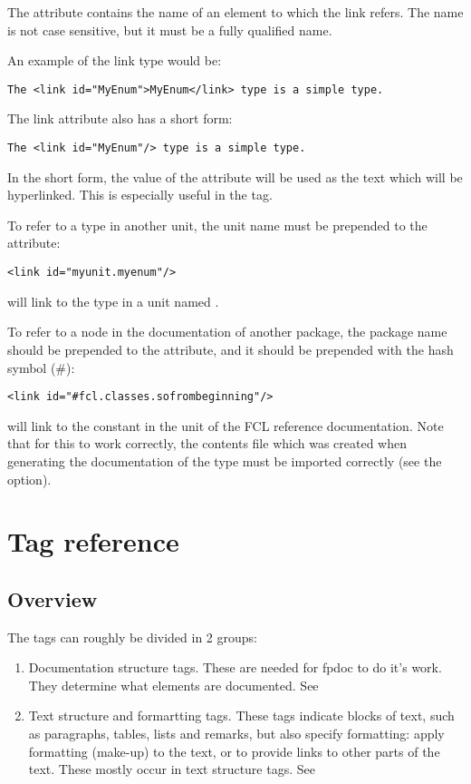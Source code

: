 The  attribute contains the name of an element to which the link
refers. The name is not case sensitive, but it must be a fully qualified
name.

An example of the link type would be:
\begin{verbatim}
The <link id="MyEnum">MyEnum</link> type is a simple type.
\end{verbatim}

The link attribute also has a short form: 
\begin{verbatim}
The <link id="MyEnum"/> type is a simple type.
\end{verbatim}
In the short form, the value of the  attribute will be used as the 
text which will be hyperlinked. This is especially useful in the 
tag.

To refer to a type in another unit, the unit name must be prepended to the
 attribute:
\begin{verbatim}
<link id="myunit.myenum"/>
\end{verbatim}
will link to the  type in a unit named .

To refer to a node in the documentation of another package, the package name
should be prepended to the  attribute, and it should be prepended
with the hash symbol (\#):
\begin{verbatim}
<link id="#fcl.classes.sofrombeginning"/>
\end{verbatim}
will link to the constant  in the  unit
of the FCL reference documentation. Note that for this to work correctly,
the contents file which was created when generating the documentation of 
the type must be imported correctly (see the  option).

\section{Tag reference}
\subsection{Overview}
The tags can roughly be divided in 2 groups:
\begin{enumerate}
\item Documentation structure tags. These are needed for fpdoc to do it's
work. They determine what elements are documented. See 
\item Text structure and formartting tags. These tags indicate blocks of text, such as
paragraphs, tables, lists and remarks, but also specify formatting: apply formatting (make-up) 
to the text, or to provide links to other parts of the text. These mostly occur in
text structure tags. See 
\end{enumerate}


